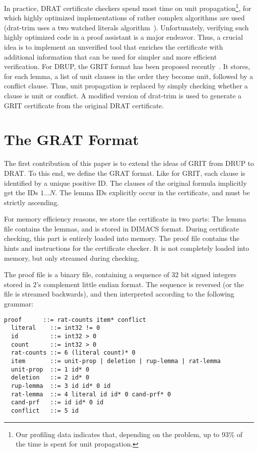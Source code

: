 \documentclass[smallcondensed]{svjour3}     %
\begin{document}
In practice, DRAT certificate checkers spend most time on unit propagation\footnote{Our profiling data indicates that, depending on the problem, up to 93\% of the time is spent for unit propagation.}, for which highly optimized implementations of rather complex algorithms 
are used (\eg drat-trim uses a two watched literals algorithm~\cite{MMZZ01}).
Unfortunately, verifying such highly optimized code in a proof assistant is a major endeavor.
Thus, a crucial idea is to implement an unverified tool that enriches the certificate with additional information that can be used for simpler and more efficient verification.
For DRUP, the GRIT format has been proposed recently~\cite{CMS17}. 
It stores, for each lemma, a list of unit clauses in the order they become unit, followed by a conflict clause.
Thus, unit propagation is replaced by 
simply checking whether a clause is unit or conflict. A modified version of drat-trim is used to generate a GRIT certificate from the original DRAT certificate.


\section{The GRAT Format}\label{sec:grat-format}
The first contribution of this paper is to extend the ideas of GRIT from DRUP to DRAT.
To this end, we define the GRAT format. 
Like for GRIT, each clause is identified by a unique positive ID. 
The clauses of the original formula implicitly get the IDs $1\ldots N$. The lemma IDs explicitly occur in the certificate, and must be strictly ascending.

For memory efficiency reasons, we store the certificate in two parts: The lemma file contains the lemmas, and is stored in DIMACS format.
During certificate checking, this part is entirely loaded into memory.
The proof file contains the hints and instructions for the certificate checker. It is not completely loaded into memory, but only streamed during checking.

The proof file is a binary file, containing a sequence of 32 bit signed integers stored in 2's complement little endian format. 
The sequence is reversed (or the file is streamed backwards), and then interpreted according to the following grammar:
\begin{lstlisting}[language={},columns={[c]fullflexible},literate={}]
  proof      ::= rat-counts item* conflict
  literal    ::= int32 != 0
  id         ::= int32 > 0
  count      ::= int32 > 0
  rat-counts ::= 6 (literal count)* 0
  item       ::= unit-prop | deletion | rup-lemma | rat-lemma
  unit-prop  ::= 1 id* 0
  deletion   ::= 2 id* 0
  rup-lemma  ::= 3 id id* 0 id
  rat-lemma  ::= 4 literal id id* 0 cand-prf* 0
  cand-prf   ::= id id* 0 id
  conflict   ::= 5 id
\end{lstlisting}
\end{document}
